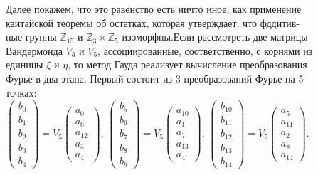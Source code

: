 \documentclass{mai_book}
\begin{document}
{ \indent Далее покажем, что это равенство есть ничто иное, как применение \\ каитайской теоремы об остатках, которая утверждает, что фддитив-\\ные группы $\mathbb Z_{15}$ и $\mathbb Z_3\times\mathbb Z_5$ изоморфны.Если рассмотреть две матрицы  
 \newpage
 \normalsize
{}
\normalsize
\noindent Вандермонда $V_3$ и $V_5$, ассоциированные, соответственно, с корнями из \\ единицы $\xi$ и $\eta$, то метод Гауда реализует вычисление преобразования \\ Фурье в два этапа. Первый состоит из 3 преобразований Фурье на 5 \\ точках:\\ 

$\begin{pmatrix}
b_0 \\ b_1 \\ b_2 \\ b_3 \\ b_4
\end{pmatrix} = V_5\begin{pmatrix}
a_0 \\ a_6 \\ a_{12} \\ a_3 \\ a_4
\end{pmatrix}$, \qquad  
$\begin{pmatrix}
b_5 \\ b_6 \\ b_7 \\ b_8 \\ b_9
\end{pmatrix} = V_5 
\begin{pmatrix}
a_{10} \\ a_1 \\ a_7 \\ a_{13} \\ a_4
\end{pmatrix}$, 
$\begin{pmatrix}
b_{10} \\ b_{11} \\ b_{12} \\ b_{13} \\ b_{14}
\end{pmatrix} = V_5 \begin{pmatrix}
a_5 \\ a_{11} \\ a_2\\ a_8 \\ a_{14}
\end{pmatrix}$.\\
  
}
\end{document}
